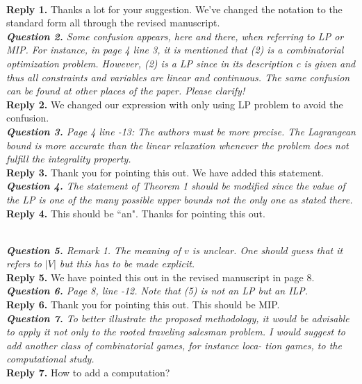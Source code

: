\documentclass[11pt]{article}
\begin{document}
\\[2mm]
\noindent \textbf{Reply 1.}
Thanks a lot for your suggestion.
We've changed the notation to the standard form all through the revised manuscript.
\\[4mm]
%
%
%
\noindent \textit{\textbf{Question 2.}
Some confusion appears, here and there, when referring to LP or MIP.
For instance, in page 4 line 3, it is mentioned that (2) is a combinatorial
optimization problem. However, (2) is a LP since in its description c is
given and thus all constraints and variables are linear and continuous.
The same confusion can be found at other places of the paper. Please
clarify!}
\\[2mm]
\noindent \textbf{Reply 2.}
We changed our expression with only using LP problem to avoid the confusion.
\\[4mm]
%
%
%
\noindent \textit{\textbf{Question 3.}
Page 4 line -13: The authors must be more precise. The Lagrangean
bound is more accurate than the linear relaxation whenever the problem does not fulfill the integrality property.
}
\\[2mm]
\noindent \textbf{Reply 3.}
Thank you for pointing this out.
We have added this statement.
\\[4mm]
%
%
%
\noindent \textit{\textbf{Question 4.}
The statement of Theorem 1 should be modified since the value of the
LP is one of the many possible upper bounds not the only one as stated
there.
}
\\[2mm]
\noinden \textbf{Reply 4.}
This should be ``an". Thanks for pointing this out.

\\[4mm]
%
%
%
\noindent \textit{\textbf{Question 5.}
Remark 1. The meaning of $v$ is unclear. One should guess that it refers
to $|V|$ but this has to be made explicit.
}
\\[2mm]
\noindent \textbf{Reply 5.}
We have pointed this out in the revised manuscript in page 8.
\\[4mm]
%
%
%
\noindent \textit{\textbf{Question 6.}
Page 8, line -12. Note that (5) is not an LP but an ILP.
}
\\[2mm]
\noindent \textbf{Reply 6.}
Thank you for pointing this out.
This should be MIP.
\\[4mm]
%
%
%
\noindent \textit{\textbf{Question 7.}
To better illustrate the proposed methodology, it would be advisable
to apply it not only to the rooted traveling salesman problem. I would
suggest to add another class of combinatorial games, for instance loca-
tion games, to the computational study.}
\\[2mm]
\noindent \textbf{Reply 7.}
How to add a computation?
\\[4mm]
%
%

\end{document}
